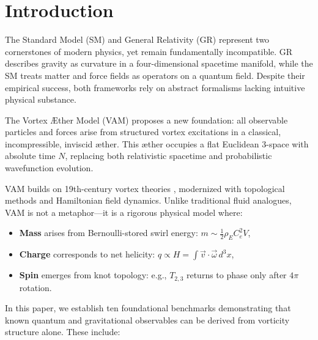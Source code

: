 \section{Introduction}

The Standard Model (SM) and General Relativity (GR) represent two cornerstones of modern physics, yet remain fundamentally incompatible. GR describes gravity as curvature in a four-dimensional spacetime manifold, while the SM treats matter and force fields as operators on a quantum field. Despite their empirical success, both frameworks rely on abstract formalisms lacking intuitive physical substance.

The Vortex \AE{}ther Model (VAM) proposes a new foundation: all observable particles and forces arise from structured vortex excitations in a classical, incompressible, inviscid æther. This æther occupies a flat Euclidean 3-space with absolute time \( N \), replacing both relativistic spacetime and probabilistic wavefunction evolution.

VAM builds on 19th-century vortex theories \cite{helmholtz1858integrals, thomson1867vortex}, modernized with topological methods and Hamiltonian field dynamics. Unlike traditional fluid analogues, VAM is not a metaphor—it is a rigorous physical model where:

\begin{itemize}
    \item \textbf{Mass} arises from Bernoulli-stored swirl energy: \( m \sim \frac{1}{2} \rho_{\scriptscriptstyle\boldsymbol\!E}C_e^2 V \),
    \item \textbf{Charge} corresponds to net helicity: \( q \propto H = \int \vec{v} \cdot \vec{\omega} \, d^3x \),
    \item \textbf{Spin} emerges from knot topology: e.g., \( T_{2,3} \) returns to phase only after \( 4\pi \) rotation.
\end{itemize}

In this paper, we establish ten foundational benchmarks demonstrating that known quantum and gravitational observables can be derived from vorticity structure alone. These include:

